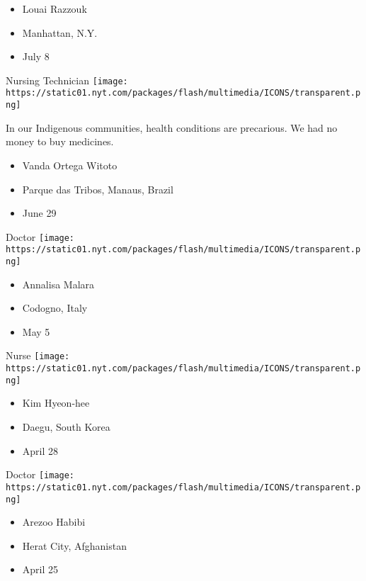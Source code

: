 \begin{itemize}
\tightlist
\item
  Louai Razzouk
\item
  Manhattan, N.Y.
\item
  July 8
\end{itemize}

\protect\hyperlink{item-vanda-ortega-witoto}{}

Nursing Technician
\texttt{[image: https://static01.nyt.com/packages/flash/multimedia/ICONS/transparent.png]}

In our Indigenous communities, health conditions are precarious. We had
no money to buy medicines.

\begin{itemize}
\tightlist
\item
  Vanda Ortega Witoto
\item
  Parque das Tribos, Manaus, Brazil
\item
  June 29
\end{itemize}

\protect\hyperlink{item-annalisa-malara}{}

Doctor
\texttt{[image: https://static01.nyt.com/packages/flash/multimedia/ICONS/transparent.png]}

\begin{itemize}
\tightlist
\item
  Annalisa Malara
\item
  Codogno, Italy
\item
  May 5
\end{itemize}

\protect\hyperlink{item-kim-hyeon-hee}{}

Nurse
\texttt{[image: https://static01.nyt.com/packages/flash/multimedia/ICONS/transparent.png]}

\begin{itemize}
\tightlist
\item
  Kim Hyeon-hee
\item
  Daegu, South Korea
\item
  April 28
\end{itemize}

\protect\hyperlink{item-arezoo-habibi}{}

Doctor
\texttt{[image: https://static01.nyt.com/packages/flash/multimedia/ICONS/transparent.png]}

\begin{itemize}
\tightlist
\item
  Arezoo Habibi
\item
  Herat City, Afghanistan
\item
  April 25
\end{itemize}

